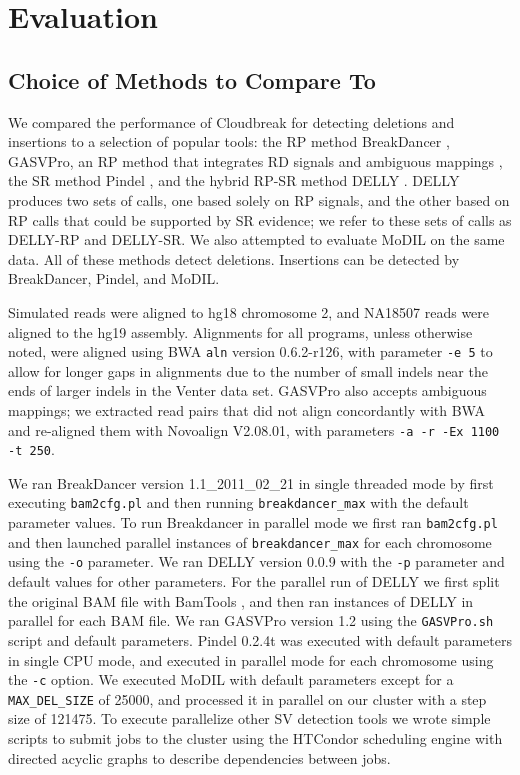 \chapter{Evaluation}\label{chap_cloudbreak_eval}

\section{Choice of Methods to Compare To}

We compared the performance of Cloudbreak for detecting deletions and insertions to a selection of popular tools: the RP method BreakDancer \cite{Chen:2009p3}, GASVPro, an RP method that integrates RD signals and ambiguous mappings \cite{Sindi:2012kk}, the SR method Pindel \cite{Ye:2009p2}, and the hybrid RP-SR method DELLY \cite{Rausch:2012he}. DELLY produces two sets of calls, one based solely on RP signals, and the other based on RP calls that could be supported by SR evidence; we refer to these sets of calls as DELLY-RP and DELLY-SR. We also attempted to evaluate MoDIL on the same data. All of these methods detect deletions. Insertions can be detected by BreakDancer, Pindel, and MoDIL. 

Simulated reads were aligned to hg18 chromosome 2, and NA18507 reads were aligned to the hg19 assembly. Alignments for all programs, unless otherwise noted, were aligned using BWA \texttt{aln} version 0.6.2-r126, with parameter \texttt{-e 5} to allow for longer gaps in alignments due to the number of small indels near the ends of larger indels in the Venter data set. GASVPro also accepts ambiguous mappings; we extracted read pairs that did not align concordantly with BWA and re-aligned them with Novoalign V2.08.01, with parameters \texttt{-a -r -Ex 1100 -t 250}. 

We ran BreakDancer version 1.1\_2011\_02\_21 in single threaded mode by first executing \texttt{bam2cfg.pl} and then running \texttt{breakdancer\_max} with the default parameter values.  To run Breakdancer in parallel mode we first ran \texttt{bam2cfg.pl} and then launched parallel instances of \texttt{breakdancer\_max} for each chromosome using the \texttt{-o} parameter. We ran DELLY version 0.0.9 with the \texttt{-p} parameter and default values for other parameters. For the parallel run of DELLY we first split the original BAM file with BamTools \cite{Barnett:2011hm}, and then ran instances of DELLY in parallel for each BAM file. We ran GASVPro version 1.2 using the \texttt{GASVPro.sh} script and default parameters. Pindel 0.2.4t was executed with default parameters in single CPU mode, and executed in parallel mode for each chromosome using the \texttt{-c} option. We executed MoDIL with default parameters except for a \texttt{MAX\_DEL\_SIZE} of 25000, and processed it in parallel on our cluster with a step size of 121475. To execute parallelize other SV detection tools we wrote simple scripts to submit jobs to the cluster using the HTCondor scheduling engine \cite{condor} with directed acyclic graphs to describe dependencies between jobs. 


